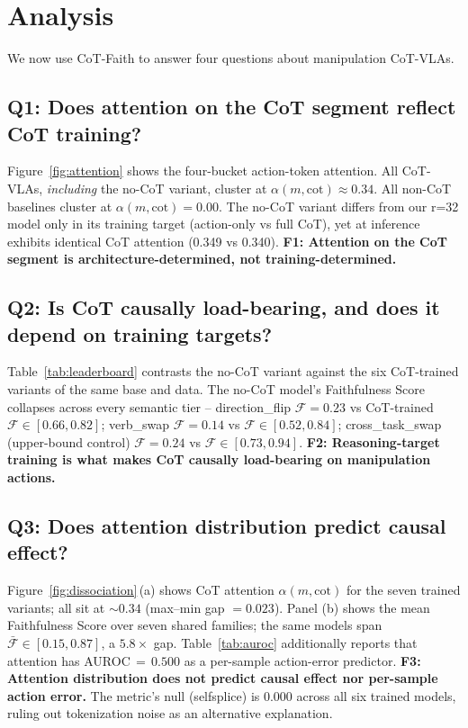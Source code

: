 \documentclass{article}
\begin{document}
\section{Analysis}
\label{sec:analysis}

We now use CoT-Faith to answer four questions about manipulation CoT-VLAs.

\subsection{Q1: Does attention on the CoT segment reflect CoT training?}

Figure~\ref{fig:attention} shows the four-bucket action-token attention. All CoT-VLAs, \emph{including} the no-CoT variant, cluster at $\alpha(m, \text{cot}) \approx 0.34$. All non-CoT baselines cluster at $\alpha(m, \text{cot}) = 0.00$. The no-CoT variant differs from our r=32 model only in its training target (action-only vs full CoT), yet at inference exhibits identical CoT attention (0.349 vs 0.340). \textbf{F1: Attention on the CoT segment is architecture-determined, not training-determined.}

\subsection{Q2: Is CoT causally load-bearing, and does it depend on training targets?}

Table~\ref{tab:leaderboard} contrasts the no-CoT variant against the six CoT-trained variants of the same base and data. The no-CoT model's Faithfulness Score collapses across every semantic tier -- direction\_flip $\mathcal{F}\!=\!0.23$ vs CoT-trained $\mathcal{F}\!\in\![0.66, 0.82]$; verb\_swap $\mathcal{F}\!=\!0.14$ vs $\mathcal{F}\!\in\![0.52, 0.84]$; cross\_task\_swap (upper-bound control) $\mathcal{F}\!=\!0.24$ vs $\mathcal{F}\!\in\![0.73, 0.94]$. \textbf{F2: Reasoning-target training is what makes CoT causally load-bearing on manipulation actions.}

\subsection{Q3: Does attention distribution predict causal effect?}

Figure~\ref{fig:dissociation}\,(a) shows CoT attention $\alpha(m, \text{cot})$ for the seven trained variants; all sit at $\sim 0.34$ (max--min gap $=0.023$). Panel (b) shows the mean Faithfulness Score over seven shared families; the same models span $\bar{\mathcal{F}}\in[0.15, 0.87]$, a $5.8\times$ gap. Table~\ref{tab:auroc} additionally reports that attention has AUROC$\,=\,0.500$ as a per-sample action-error predictor. \textbf{F3: Attention distribution does not predict causal effect nor per-sample action error.} The metric's null (selfsplice) is $0.000$ across all six trained models, ruling out tokenization noise as an alternative explanation.
\end{document}
